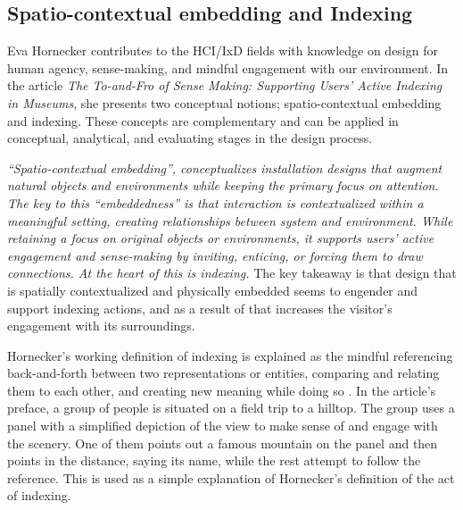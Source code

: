 \subsection{Spatio-contextual embedding and Indexing}
Eva Hornecker contributes to the HCI/IxD fields with knowledge on design for human agency, sense-making, and mindful engagement with our environment. In the article \emph{The To-and-Fro of Sense Making: Supporting Users’ Active Indexing in Museums}, she presents two conceptual notions; spatio-contextual embedding and indexing. These concepts are complementary and can be applied in conceptual, analytical, and evaluating stages in the design process.

\emph{“Spatio-contextual embedding”, conceptualizes installation designs that augment natural objects and environments while keeping the primary focus on attention. The key to this “embeddedness” is that interaction is contextualized within a meaningful setting, creating relationships between system and environment. While retaining a focus on original objects or environments, it supports users’ active engagement and sense-making by inviting, enticing, or forcing them to draw connections. At the heart of this is indexing.} \autocite[p. 1]{hornecker_to-and-fro_2016} The key takeaway is that design that is spatially contextualized and physically embedded seems to engender and support indexing actions, and as a result of that increases the visitor's engagement with its surroundings. 

Hornecker’s working definition of indexing is explained as the mindful referencing back-and-forth between two representations or entities, comparing and relating them to each other, and creating new meaning while doing so \autocite[p. 2]{hornecker_to-and-fro_2016}. In the article's preface, a group of people is situated on a field trip to a hilltop. The group uses a panel with a simplified depiction of the view to make sense of and engage with the scenery. One of them points out a famous mountain on the panel and then points in the distance, saying its name, while the rest attempt to follow the reference. This is used as a simple explanation of Hornecker's definition of the act of indexing.

